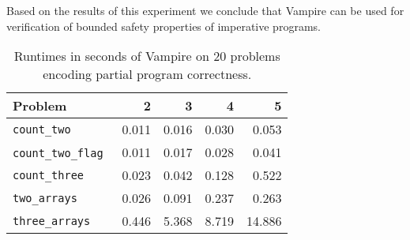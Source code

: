 Based on the results of this experiment we conclude that Vampire can be used for verification of bounded safety properties of imperative programs.


\begin{table}[tb]
  \caption{Runtimes in seconds of Vampire on 20 problems encoding partial program correctness.}
  \begin{center}
  \begin{tabular}{lrrrr}
    \hline Problem & 2 & 3 & 4 & 5 \\ \hline
    \verb'count_two'        &  0.011  &  0.016  &  0.030  &  0.053 \\
    \verb'count_two_flag'~  &  0.011  &  0.017  &  0.028  &  0.041 \\
    \verb'count_three'      &  0.023  &  0.042  &  0.128  &  0.522 \\
    \verb'two_arrays'       &  0.026  &  0.091  &  0.237  &  0.263 \\
    \verb'three_arrays'     &  0.446  &  5.368  &  8.719  & 14.886
  \end{tabular}
  \end{center}
  \label{table:examples-results}
\end{table}